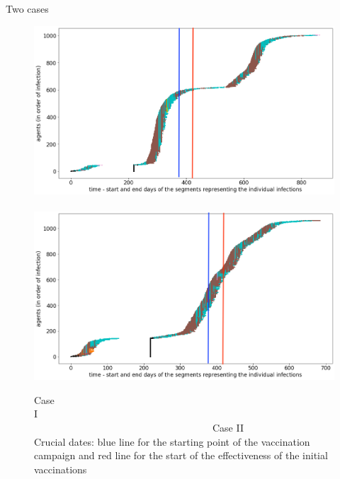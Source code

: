 \documentclass[8pt]{beamer}
\begin{document}
\begin{frame}{Two cases}

\begin{figure}[H]
\center
\includegraphics[scale=0.14]{CaseForGA_I_base.png}~~~\includegraphics[scale=0.14]{CaseForGA_II_base.png}
\caption{Case I~~~~~~~~~~~~~~~~~~~~~~~~~~~~~~~~~~~~~~~~~~~~~~~~~~~~~~~~~~~~~~~~~~~~~~~~~~~~~~~~~~~~~~~~~~~~~~~Case II\\Crucial dates: blue line for the starting point of the vaccination campaign and red line for the start of the effectiveness of the initial vaccinations}
\label{twoCases}
\end{figure}

\end{frame}
\end{document}

